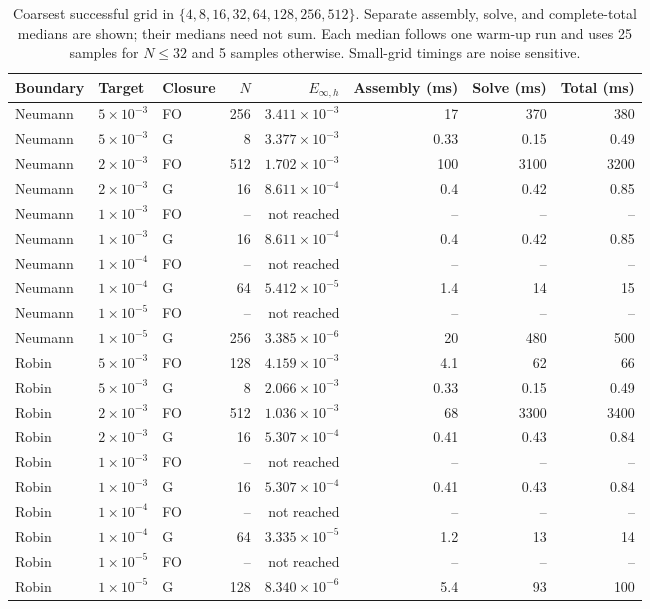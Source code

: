 \begin{table}[htbp]
\centering
\footnotesize
\setlength{\tabcolsep}{4pt}
\begin{tabular}{lllrrrrr}
\toprule
Boundary & Target & Closure & $N$ & $E_{\infty,h}$ & Assembly (ms) & Solve (ms) & Total (ms) \\
\midrule
Neumann & $5\times10^{-3}$ & FO & 256 & $3.411\times10^{-3}$ & 17 & 370 & 380 \\
Neumann & $5\times10^{-3}$ & G & 8 & $3.377\times10^{-3}$ & 0.33 & 0.15 & 0.49 \\
Neumann & $2\times10^{-3}$ & FO & 512 & $1.702\times10^{-3}$ & 100 & 3100 & 3200 \\
Neumann & $2\times10^{-3}$ & G & 16 & $8.611\times10^{-4}$ & 0.4 & 0.42 & 0.85 \\
Neumann & $1\times10^{-3}$ & FO & -- & not reached & -- & -- & -- \\
Neumann & $1\times10^{-3}$ & G & 16 & $8.611\times10^{-4}$ & 0.4 & 0.42 & 0.85 \\
Neumann & $1\times10^{-4}$ & FO & -- & not reached & -- & -- & -- \\
Neumann & $1\times10^{-4}$ & G & 64 & $5.412\times10^{-5}$ & 1.4 & 14 & 15 \\
Neumann & $1\times10^{-5}$ & FO & -- & not reached & -- & -- & -- \\
Neumann & $1\times10^{-5}$ & G & 256 & $3.385\times10^{-6}$ & 20 & 480 & 500 \\
Robin & $5\times10^{-3}$ & FO & 128 & $4.159\times10^{-3}$ & 4.1 & 62 & 66 \\
Robin & $5\times10^{-3}$ & G & 8 & $2.066\times10^{-3}$ & 0.33 & 0.15 & 0.49 \\
Robin & $2\times10^{-3}$ & FO & 512 & $1.036\times10^{-3}$ & 68 & 3300 & 3400 \\
Robin & $2\times10^{-3}$ & G & 16 & $5.307\times10^{-4}$ & 0.41 & 0.43 & 0.84 \\
Robin & $1\times10^{-3}$ & FO & -- & not reached & -- & -- & -- \\
Robin & $1\times10^{-3}$ & G & 16 & $5.307\times10^{-4}$ & 0.41 & 0.43 & 0.84 \\
Robin & $1\times10^{-4}$ & FO & -- & not reached & -- & -- & -- \\
Robin & $1\times10^{-4}$ & G & 64 & $3.335\times10^{-5}$ & 1.2 & 13 & 14 \\
Robin & $1\times10^{-5}$ & FO & -- & not reached & -- & -- & -- \\
Robin & $1\times10^{-5}$ & G & 128 & $8.340\times10^{-6}$ & 5.4 & 93 & 100 \\
\bottomrule
\end{tabular}
\caption{Coarsest successful grid in $\{4,8,16,32,64,128,256,512\}$. Separate assembly, solve, and complete-total medians are shown; their medians need not sum. Each median follows one warm-up run and uses 25 samples for $N\le32$ and 5 samples otherwise. Small-grid timings are noise sensitive.}
\label{tab:matched-accuracy}
\end{table}
